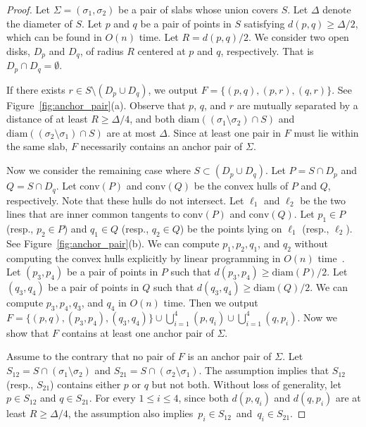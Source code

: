 \documentclass[english,a4paper, cleveref, autoref, thm-restate, nolineno]{socg-lipics-v2021}
\theoremstyle{star}
\theoremstyle{claimstar}
\newcommand{\diam}{\ensuremath{\mathrm{diam}}}
\newcommand{\conv}{\ensuremath{\mathrm{conv}}}
\begin{document}
\begin{proof}
    Let $\Sigma = (\sigma_1, \sigma_2)$ be a pair of slabs whose union covers $S$.
    Let $\Delta$ denote the diameter of $S$. 
    Let $p$ and $q$ be a pair of points in $S$ satisfying $d(p, q) \ge \Delta/2$, which can be found in $O(n)$ time.
    Let $R = d(p, q)/2$. 
    We consider two open disks, $D_p$ and $D_q$, of radius $R$ centered at $p$ and $q$, respectively. 
    That is $D_p \cap D_q = \emptyset$.

    If there exists $r\in S\setminus (D_p\cup D_q)$, 
    we output $F = \{(p,q ), (p, r), (q, r) \}$. See Figure~\ref{fig:anchor_pair}(a). 
    Observe that $p$, $q$, and $r$ are mutually separated by a distance of at least $R \geq \Delta/4$, and both $\diam((\sigma_1 \setminus \sigma_2) \cap S)$ and $\diam((\sigma_2 \setminus \sigma_1) \cap S)$ are at most $\Delta$.
    Since at least one pair in $F$ must lie within the same slab, $F$ necessarily contains an anchor pair of $\Sigma$.

    Now we consider the remaining case where $S\subset (D_p \cup D_q)$. 
    Let $P = S\cap D_p$ and $Q = S\cap D_q$. 
    Let $\conv(P)$ and $\conv(Q)$ be the convex hulls of $P$ and $Q$, respectively. Note that these hulls do not intersect. 
    Let $\ell_1$ and $\ell_2$ be the two lines that are inner common tangents to $\conv(P)$ and $\conv(Q)$. 
    Let $p_1 \in P$ (resp., $p_2 \in P$) and $q_1 \in Q$ (resp., $q_2 \in Q$) be the points lying on $\ell_1$ (resp., $\ell_2$). 
    See Figure~\ref{fig:anchor_pair}(b).
    We can compute $p_1, p_2, q_1$, and $q_2$ without computing the convex hulls explicitly by linear programming in $O(n)$ time~\cite{Dyer1984LinearTime_LP, Megiddo1984LinearTime_LP}. 
    Let $(p_3, p_4)$ be a pair of points in $P$ such that $d(p_3, p_4) \ge \diam(P)/2$. 
    Let $(q_3, q_4)$ be a pair of points in $Q$ such that $d(q_3, q_4) \ge \diam(Q)/2$. We can compute $p_3, p_4, q_3$, and $q_4$ in $O(n)$ time. 
    Then we output $F = \{(p, q), (p_3, p_4), (q_3, q_4) \} \cup \bigcup_{i=1}^4 (p, q_i)  \cup \bigcup_{i=1}^4 (q, p_i)$. Now we show that $F$ contains at least one anchor pair of $\Sigma$.

    Assume to the contrary that no pair of $F$ is an anchor pair of $\Sigma$. 
    Let $S_{12} = S\cap (\sigma_1 \setminus \sigma_2)$ and $S_{21} = S\cap (\sigma_2 \setminus \sigma_1)$.
    The assumption implies that $S_{12}$ (resp., $S_{21}$) contains either $p$ or $q$ but not both. 
    Without loss of generality, let $p\in S_{12}$ and $q \in S_{21}$. 
    For every $1\le i \le 4$, since both $d(p, q_i)$ and $d(q, p_i)$ are at least $R \ge \Delta/4$, the assumption also implies~$p_i \in S_{12}$~and~$q_i \in S_{21}$.


\end{proof}
\end{document}
